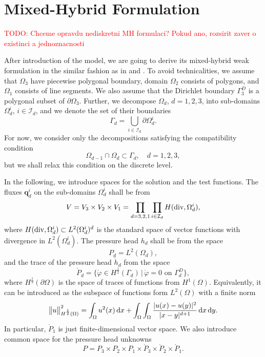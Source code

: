 \documentclass[times]{nlaauth}%
\def\d{\delta}
\def\norm#1{\|#1\|}
\def\div{{\rm div}}
\def\d{\,{\rm d}}               %
\def\vc#1{\mathbf{\boldsymbol{#1}}}     %
\def\abs#1{\lvert#1\rvert}
\def\norm#1{\bigl\Vert#1\bigr\Vert} %
\def\where{\,|\,}                    %
\def\prtl{\partial}                                        %
\def\phi{\varphi}
\def\todo#1{\textcolor{red}{TODO: #1} }
\begin{document}
\section{Mixed-Hybrid Formulation}
\todo{ Chceme opravdu nediskretni MH formulaci? Pokud ano, rozsirit zaver o existinci a jednoznacnosti}

\label{mathematical_formulation}
After introduction of the model, we are going to derive its mixed-hybrid weak formulation in the similar fashion as in 
\cite{brezina_mixed-hybrid_2010} and  \cite{maryska_mixed-hybrid_1995}.
To avoid technicalities, we assume that $\Omega_3$ have piecewise polygonal boundary, domain $\Omega_2$ consists of polygons, and
$\Omega_1$ consists of line segments. We also assume that the Dirichlet boundary $\Gamma_3^D$ 
is a polygonal subset of $\prtl\Omega_3$. 
Further, we decompose $\Omega_d$, $d=1,2,3$, into sub-domains $\Omega_d^i$, $i\in \mathcal{I}_d$,
and we denote the set of their boundaries
\[
 \Gamma_{d}=\bigcup_{i\in \mathcal{I}_d} \prtl\Omega_d^i.
\]
For now, we consider only the decompositions satisfying the compatibility condition
\begin{equation}
 \Omega_{d-1}\cap\Omega_{d} \subset \Gamma_d,\quad d=1,2,3,
 \label{eq:compatible}
\end{equation}
but we shall relax this condition on the discrete level.

In the following, we introduce spaces for the solution and the test functions. The fluxes $\vc q_d^i$ on the sub-domains 
$\Omega_d^i$ shall be from
\begin{equation}
    \label{Vspace}
        V=V_3\times V_2\times V_1=
                \prod_{d=3,2,1} \prod_{i\in \mathcal{I}_d} H(\div,\Omega_d^i),
\end{equation}
where $H(\div,\Omega_d^i)\subset L^2(\Omega_d^i)^d$ is the standard space of vector functions with divergence in 
$L^2(\Omega_d^i)$. The pressure head $h_d$ shall be from the space
\begin{equation}
        P_d=L^2(\Omega_d),
\end{equation}
and the trace of the pressure head $\mathring h_d$ from the space
\begin{equation}
        \mathring{P}_d=
           \Big\{\mathring{\phi}\in H^{\frac12}(\Gamma_d)\where \mathring{\phi}=0 \text{ on } \Gamma_d^D\Big\},
\end{equation}
where $H^{\frac12}(\prtl\Omega)$ is the space of traces of functions from $H^1(\Omega)$. Equivalently, it can be introduced
as the subspace of functions form $L^2(\Omega)$ with a finite norm
\begin{equation}
 \label{eq:frac_H_norm}
 \norm{u}_{H^\frac12(\Omega)}^2 = \int_\Omega u^2(x)\d x + \int_\Omega\int_\Omega \frac{\abs{u(x)-u(y)}^2}{\abs{x-y}^{d+1}}\d x \d y.
\end{equation}
In particular, $\mathring{P}_1$ is just finite-dimensional vector space. 
We also introduce common space for the pressure head unknowns
\begin{equation}
            P=P_3\times P_2\times P_1\times 
          \mathring{P}_3\times \mathring{P}_2\times \mathring{P}_1.
\end{equation}
\end{document}
